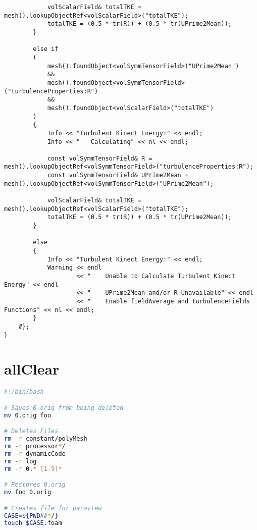 \begin{lstlisting}
			volScalarField& totalTKE = mesh().lookupObjectRef<volScalarField>("totalTKE");
			totalTKE = (0.5 * tr(R)) + (0.5 * tr(UPrime2Mean));
		}

		else if
		(
			mesh().foundObject<volSymmTensorField>("UPrime2Mean")
			&&
			mesh().foundObject<volSymmTensorField>("turbulenceProperties:R")
			&&
			mesh().foundObject<volScalarField>("totalTKE")
		)
		{
			Info << "Turbulent Kinect Energy:" << endl;
			Info << "	Calculating" << nl << endl;

			const volSymmTensorField& R = mesh().lookupObjectRef<volSymmTensorField>("turbulenceProperties:R");
			const volSymmTensorField& UPrime2Mean = mesh().lookupObjectRef<volSymmTensorField>("UPrime2Mean");

			volScalarField& totalTKE = mesh().lookupObjectRef<volScalarField>("totalTKE");
			totalTKE = (0.5 * tr(R)) + (0.5 * tr(UPrime2Mean));
		}

		else
		{
			Info << "Turbulent Kinect Energy:" << endl;
			Warning << endl
					<< "	Unable to Calculate Turbulent Kinect Energy" << endl
					<< "	UPrime2Mean and/or R Unavailable" << endl
					<< "	Enable fieldAverage and turbulenceFields Functions" << nl << endl;
		}
	#};
}

\end{lstlisting}

\section{allClear}
\begin{lstlisting}[language=bash]
#!/bin/bash

# Saves 0.orig from being deleted
mv 0.orig foo

# Deletes Files
rm -r constant/polyMesh
rm -r processor*/
rm -r dynamicCode
rm -r log
rm -r 0.* [1-9]*

# Restores 0.orig
mv foo 0.orig

# Creates file for paraview
CASE=${PWD##*/}
touch $CASE.foam

\end{lstlisting}

